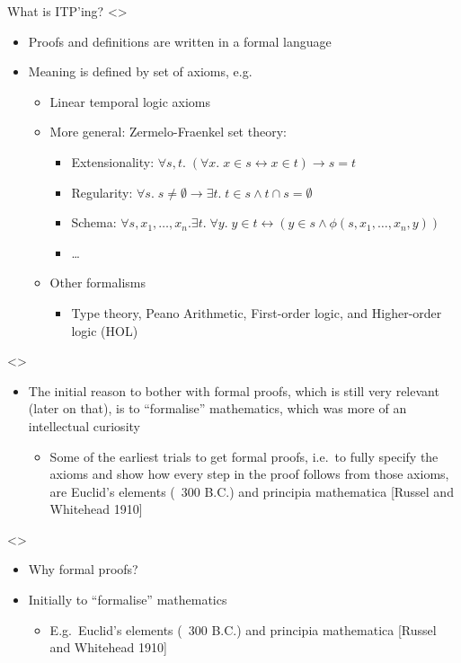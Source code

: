 \documentclass[compress,10pt,xcolor=dvipsnames]{beamer}
\begin{document}
\begin{frame}{What is ITP'ing?}
\only<\axioms>{
  \begin{itemize}
  \item Proofs and definitions are written in a formal language
  \item Meaning is defined by set of axioms, e.g.
    \begin{itemize}
    \item Linear temporal logic axioms
    \item More general: Zermelo-Fraenkel set theory:
      \begin{itemize}
        \item Extensionality: {\small $\forall s,t.\; (\forall x.\; x\in s \leftrightarrow x\in t) \rightarrow s = t$}
        \item Regularity: {\small $\forall s.\; s\neq\emptyset \rightarrow \exists t.\; t\in s \wedge t\cap s =\emptyset$}
        \item Schema: {\small $\forall s,x_1,\dots,x_n.\exists t.\; \forall y.\; y\in t \leftrightarrow (y\in s \wedge \phi(s,x_1,\dots,x_n,y))$}
        \item \dots
      \end{itemize}
    \item Other formalisms
      \begin{itemize}
      \item Type theory, Peano Arithmetic, First-order logic, and {\color{awesome}Higher-order logic (HOL)}
      \end{itemize}
    \end{itemize}
  \end{itemize}
}

\note<\whyformal>{
\tiny
  \begin{itemize}
  \item The initial reason to bother with formal proofs, which is still very relevant (later on that), is to ``formalise'' mathematics, which was more of an intellectual curiosity
    \begin{itemize}
    \item Some of the earliest trials to get formal proofs, i.e.\ to fully specify the axioms and show how every step in the proof follows from those axioms, are Euclid's elements (~300 B.C.) and principia mathematica [Russel and Whitehead 1910] 
    \end{itemize}
  \end{itemize}
}

\only<\whyformal>{
  \begin{itemize}
  \item Why formal proofs?
  \item Initially to ``formalise'' mathematics
    \begin{itemize}
    \item E.g.\ Euclid's elements (~300 B.C.) and principia mathematica [Russel and Whitehead 1910] 
    \end{itemize}
  \end{itemize}
}


\end{frame}
\end{document}
